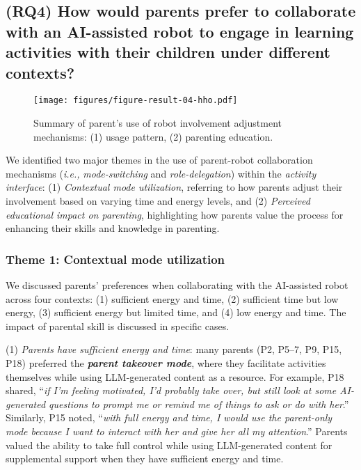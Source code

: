 
\subsection{(RQ4) How would parents prefer to collaborate with an AI-assisted robot to engage in learning activities with their children under different contexts?}

\begin{figure*}[b!]
\texttt{[image: figures/figure-result-04-hho.pdf]}
   \vspace{-6pt}
  \caption{Summary of parent's use of robot involvement adjustment mechanisms: (1) usage pattern, (2) parenting education.}
  \label{fig:result-03}
   \vspace{-6pt}
\end{figure*}

We identified two major themes in the use of parent-robot collaboration mechanisms (\textit{i.e.,} \textit{mode-switching} and \textit{role-delegation}) within the \textit{activity interface}: (1) \textit{Contextual mode utilization}, referring to how parents adjust their involvement based on varying time and energy levels, and (2) \textit{Perceived educational impact on parenting}, highlighting how parents value the process for enhancing their skills and knowledge in parenting.

\subsubsection{Theme 1: Contextual mode utilization}

We discussed parents' preferences when collaborating with the AI-assisted robot across four contexts: (1) sufficient energy and time, (2) sufficient time but low energy, (3) sufficient energy but limited time, and (4) low energy and time. The impact of parental skill is discussed in specific cases.

(1) \textit{Parents have sufficient energy and time}: many parents (P2, P5–7, P9, P15, P18) preferred the \textit{\textbf{parent takeover mode}}, where they facilitate activities themselves while using LLM-generated content as a resource. For example, P18 shared, ``\textit{if I'm feeling motivated, I'd probably take over, but still look at some AI-generated questions to prompt me or remind me of things to ask or do with her}.'' Similarly, P15 noted, ``\textit{with full energy and time, I would use the parent-only mode because I want to interact with her and give her all my attention}.'' Parents valued the ability to take full control while using LLM-generated content for supplemental support when they have sufficient energy and time.

